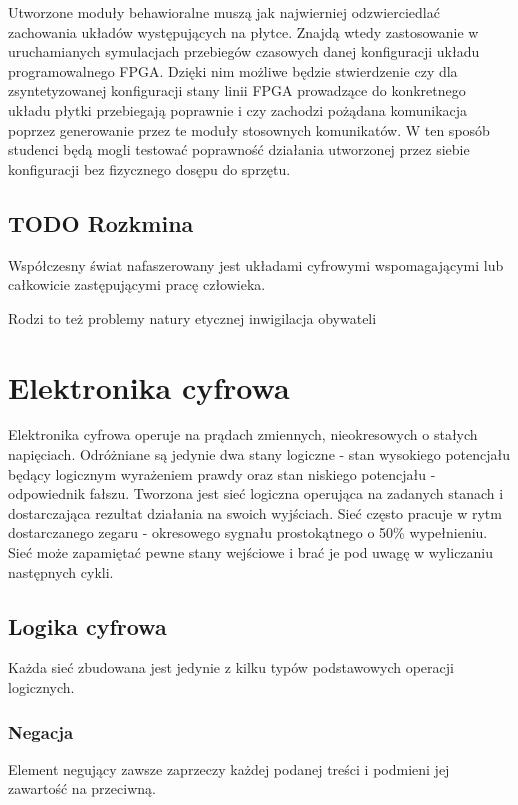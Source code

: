 \documentclass[a4paper,12pt]{article}
\begin{document}
Utworzone moduły behawioralne muszą jak najwierniej odzwierciedlać zachowania układów występujących na płytce.
Znajdą wtedy zastosowanie w uruchamianych symulacjach przebiegów czasowych danej konfiguracji układu programowalnego FPGA. Dzięki nim możliwe będzie stwierdzenie czy dla zsyntetyzowanej konfiguracji stany linii FPGA prowadzące do konkretnego układu płytki przebiegają poprawnie i czy zachodzi pożądana komunikacja poprzez generowanie przez te moduły stosownych komunikatów. W ten sposób studenci będą mogli testować poprawność działania utworzonej przez siebie konfiguracji bez fizycznego dosępu do sprzętu.

\subsection{TODO Rozkmina}

Współczesny świat nafaszerowany jest układami cyfrowymi wspomagającymi lub całkowicie zastępującymi pracę człowieka.

Rodzi to też problemy natury etycznej inwigilacja obywateli

\section{Elektronika cyfrowa}
Elektronika cyfrowa operuje na prądach zmiennych, nieokresowych o stałych napięciach. Odróżniane są jedynie dwa stany logiczne - stan wysokiego potencjału będący logicznym wyrażeniem prawdy oraz stan niskiego potencjału - odpowiednik fałszu. Tworzona jest sieć logiczna operująca na zadanych stanach i dostarczająca rezultat działania na swoich wyjściach. Sieć często pracuje w rytm dostarczanego zegaru - okresowego sygnału prostokątnego o 50\% wypełnieniu. Sieć może zapamiętać pewne stany wejściowe i brać je pod uwagę w wyliczaniu następnych cykli.

\subsection{Logika cyfrowa}
Każda sieć zbudowana jest jedynie z kilku typów podstawowych operacji logicznych.

\subsubsection{Negacja}
Element negujący zawsze zaprzeczy każdej podanej treści i podmieni jej zawartość na przeciwną.
\end{document}
